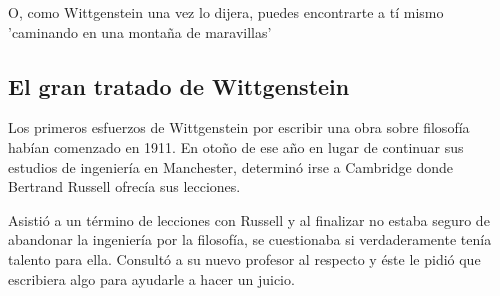    O, como Wittgenstein una vez lo dijera, puedes encontrarte a tí mismo
   'caminando en una montaña de maravillas'




\subsection{El gran tratado de Wittgenstein}


Los primeros esfuerzos de Wittgenstein por escribir una obra sobre filosofía
habían comenzado en 1911. En otoño de ese año en lugar de continuar sus estudios
de ingeniería en Manchester, determinó irse a Cambridge donde Bertrand Russell
ofrecía sus lecciones.

Asistió a un término de lecciones con Russell y al finalizar no estaba seguro de
abandonar la ingeniería por la filosofía, se cuestionaba si verdaderamente tenía
talento para ella. Consultó a su nuevo profesor al respecto y éste le pidió que
escribiera algo para ayudarle a hacer un juicio.


